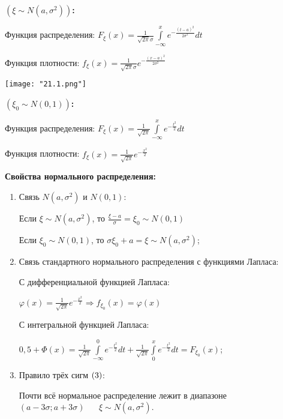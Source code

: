 \textbf{$(\xi \sim N(a, \sigma^2))$:}
    \smallskip

    Функция распределения: $F_{\xi}(x) = \frac{1}{\sqrt{2 \pi} \sigma}
    \int\limits^{x}_{-\infty} e^{-\frac{(t - a)^2}{2 \sigma^2}}dt$
    \smallskip

    Функция плотности: $f_{\xi}(x) = \frac{1}{\sqrt{2 \pi}\sigma} 
    e^{-\frac{(x - a)^2}{2 \sigma^2}}$
    \smallskip

    \begin{center}
        \texttt{[image: "21.1.png"]}
    \end{center}
    \bigskip

\textbf{$(\xi_0 \sim N(0, 1))$:}
    \smallskip
    
    Функция распределения: $F_{\xi}(x) = \frac{1}{\sqrt{2 \pi}}
    \int\limits^{x}_{-\infty} e^{-\frac{t^2}{2}}dt$
    \smallskip

    Функция плотности: $f_{\xi}(x) = \frac{1}{\sqrt{2 \pi}} 
    e^{-\frac{x^2}{2}}$
    \bigskip

\textbf{Свойства нормального распределения:}
    \smallskip
    
    \begin{enumerate}
        \item{Связь $N(a, \sigma^2)$ и $N(0, 1)$:
        \bigskip
        
        Если $\xi \sim N(a, \sigma^2)$, то $\frac{\xi - a}{\sigma} = \xi_0 \sim N(0, 1)$
        \smallskip

        Если $\xi_0 \sim N(0, 1)$, то $\sigma \xi_0 + a = \xi \sim N(a, \sigma^2)$;}
        \item{Связь стандартного нормального распределения с функциями Лапласа:
        \bigskip

        С дифференциальной функцией Лапласа: 

        $\varphi(x) = \frac{1}{\sqrt{2 \pi}}e^{- \frac{x^2}{2}} \Rightarrow
        f_{\xi_0}(x) = \varphi(x)$
        \smallskip
        
        С интегральной функцией Лапласа:
        
        $0,5 + \Phi(x) = \frac{1}{\sqrt{2 \pi}} \int\limits^{0}_{-\infty} e^{-\frac{t^2}{2}}dt +
        \frac{1}{\sqrt{2 \pi}} \int\limits^{x}_{0} e^{-\frac{t^2}{2}}dt = 
        F_{\xi_0}(x)$;}
        \item{Правило трёх сигм $(3 \time \sigma)$:
        \bigskip
        
        Почти всё нормальное распределение лежит в диапазоне 
        $(a - 3 \sigma; a + 3 \sigma) \;\;\;\;\;\; \xi \sim N(a, \sigma^2)$.}
    \end{enumerate}

